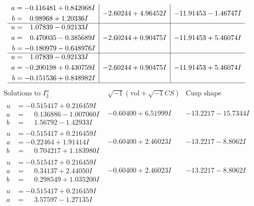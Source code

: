 \documentclass[1p]{elsarticle_modified}
\theoremstyle{definition}
\newcommand{\I}{\sqrt{-1}}
\begin{document}
$$\begin{array}{c|c|c}
\begin{aligned}
a &= -0.116481 + 0.842068 I \\
b &= \phantom{-}0.98968 + 1.20336 I\end{aligned}
 & -2.60244 + 4.96452 I & -11.91453 - 1.46747 I \\ \hline\begin{aligned}
u &= \phantom{-}1.07839 - 0.92133 I \\
a &= \phantom{-}0.470035 - 0.385689 I \\
b &= -0.180979 - 0.648976 I\end{aligned}
 & -2.60244 + 0.90475 I & -11.91453 + 5.46074 I \\ \hline\begin{aligned}
u &= \phantom{-}1.07839 - 0.92133 I \\
a &= -0.200198 + 0.430759 I \\
b &= -0.151536 + 0.848982 I\end{aligned}
 & -2.60244 + 0.90475 I & -11.91453 + 5.46074 I\\
 \hline 
 \end{array}$$\newpage$$\begin{array}{c|c|c}  
\text{Solutions to }I^u_{2}& \I (\text{vol} + \sqrt{-1}CS) & \text{Cusp shape}\\
 \hline 
\begin{aligned}
u &= -0.515417 + 0.216459 I \\
a &= \phantom{-}0.136886 - 1.007060 I \\
b &= \phantom{-}1.56792 - 1.42933 I\end{aligned}
 & -0.60400 + 6.51999 I & -13.2217 - 15.7344 I \\ \hline\begin{aligned}
u &= -0.515417 + 0.216459 I \\
a &= -0.22464 + 1.91414 I \\
b &= \phantom{-}0.704217 + 1.183980 I\end{aligned}
 & -0.60400 + 2.46023 I & -13.2217 - 8.8062 I \\ \hline\begin{aligned}
u &= -0.515417 + 0.216459 I \\
a &= \phantom{-}0.34137 + 2.44050 I \\
b &= \phantom{-}0.298549 + 1.035200 I\end{aligned}
 & -0.60400 + 2.46023 I & -13.2217 - 8.8062 I \\ \hline\begin{aligned}
u &= -0.515417 + 0.216459 I \\
a &= \phantom{-}3.57597 - 1.27135 I \\

\end{aligned}
\end{array}$$
\end{document}
